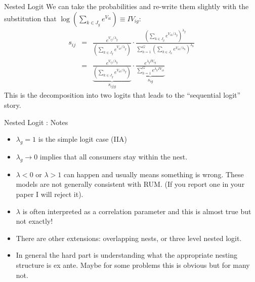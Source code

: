 \begin{frame}{Nested Logit}
We can take the probabilities and re-write them slightly with the substitution that 
$\log \left(\sum_{k \in J_g} e^{V_{ik}} \right)\equiv IV_{ig}$:
\begin{eqnarray*}
s_{ij} &=& \frac{ e^{V_{ij}/\lambda_g}}{ \left(\sum_{k \in J_g} e^{V_{ik}/\lambda_g} \right)}
\cdot
\frac{ \left(\sum_{k \in J_g} e^{V_{ik}/\lambda_g} \right)^{\lambda_g}}{\sum_{h=1}^G \left(\sum_{k \in J_h} e^{V_{ik}/\lambda_h} \right)^{\lambda_h}} \\
&=& \underbrace{\frac{ e^{V_{ij}/\lambda_g}}{ \left(\sum_{k \in J_g} e^{V_{ik}/\lambda_g} \right)}}_{s_{i j | g}}
\cdot
\underbrace{\frac{e^{\lambda_g IV_{ig}}}{\sum_{h=1}^{G} e^{\lambda_h IV_{ih}} }}_{s_{ig}}
\end{eqnarray*}
This is the decomposition into two logits that leads to the ``sequential logit'' story.
\end{frame}

\begin{frame}{Nested Logit : Notes}
\begin{itemize}
\item $\lambda_g=1$ is the simple logit case (IIA)
\item $\lambda_g \rightarrow 0$ implies that all consumers stay within the nest.
\item $\lambda < 0$ or $\lambda > 1$ can happen and usually means something is wrong. These models are not generally consistent with RUM. (If you report one in your paper I will reject it).
\item $\lambda$ is often interpreted as a correlation parameter and this is almost true but not exactly!
\item There are other extensions: overlapping nests, or three level nested logit. 
\item In general the hard part is understanding what the appropriate nesting structure is ex ante. Maybe for some problems this is obvious but for many not.
\end{itemize}
\end{frame}



